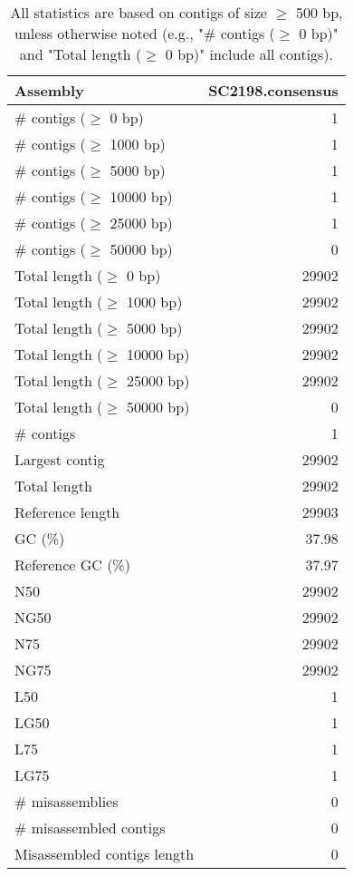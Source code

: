 \documentclass[12pt,a4paper]{article}
\begin{document}
\begin{table}[ht]
\begin{center}
\caption{All statistics are based on contigs of size $\geq$ 500 bp, unless otherwise noted (e.g., "\# contigs ($\geq$ 0 bp)" and "Total length ($\geq$ 0 bp)" include all contigs).}
\begin{tabular}{|l*{1}{|r}|}
\hline
Assembly & SC2198.consensus \\ \hline
\# contigs ($\geq$ 0 bp) & 1 \\ \hline
\# contigs ($\geq$ 1000 bp) & 1 \\ \hline
\# contigs ($\geq$ 5000 bp) & 1 \\ \hline
\# contigs ($\geq$ 10000 bp) & 1 \\ \hline
\# contigs ($\geq$ 25000 bp) & 1 \\ \hline
\# contigs ($\geq$ 50000 bp) & 0 \\ \hline
Total length ($\geq$ 0 bp) & 29902 \\ \hline
Total length ($\geq$ 1000 bp) & 29902 \\ \hline
Total length ($\geq$ 5000 bp) & 29902 \\ \hline
Total length ($\geq$ 10000 bp) & 29902 \\ \hline
Total length ($\geq$ 25000 bp) & 29902 \\ \hline
Total length ($\geq$ 50000 bp) & 0 \\ \hline
\# contigs & 1 \\ \hline
Largest contig & 29902 \\ \hline
Total length & 29902 \\ \hline
Reference length & 29903 \\ \hline
GC (\%) & 37.98 \\ \hline
Reference GC (\%) & 37.97 \\ \hline
N50 & 29902 \\ \hline
NG50 & 29902 \\ \hline
N75 & 29902 \\ \hline
NG75 & 29902 \\ \hline
L50 & 1 \\ \hline
LG50 & 1 \\ \hline
L75 & 1 \\ \hline
LG75 & 1 \\ \hline
\# misassemblies & 0 \\ \hline
\# misassembled contigs & 0 \\ \hline
Misassembled contigs length & 0 \\ \hline

\end{tabular}
\end{center}
\end{table}
\end{document}
